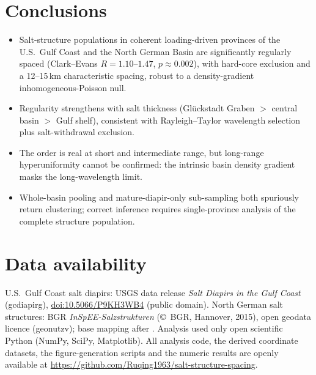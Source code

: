 \documentclass[11pt]{article}
\begin{document}
\section{Conclusions}
\begin{itemize}\setlength\itemsep{1pt}
\item Salt-structure populations in coherent loading-driven provinces of the U.S.\ Gulf Coast and the North
German Basin are significantly regularly spaced (Clark--Evans $R=1.10$--$1.47$, $p\approx0.002$), with
hard-core exclusion and a 12--15\,km characteristic spacing, robust to a density-gradient
inhomogeneous-Poisson null.
\item Regularity strengthens with salt thickness (Gl\"uckstadt Graben $>$ central basin $>$ Gulf shelf),
consistent with Rayleigh--Taylor wavelength selection plus salt-withdrawal exclusion.
\item The order is real at short and intermediate range, but long-range hyperuniformity cannot be confirmed:
the intrinsic basin density gradient masks the long-wavelength limit.
\item Whole-basin pooling and mature-diapir-only sub-sampling both spuriously return clustering; correct
inference requires single-province analysis of the complete structure population.
\end{itemize}

\section*{Data availability}
U.S.\ Gulf Coast salt diapirs: USGS data release \emph{Salt Diapirs in the Gulf Coast} (gcdiapirg),
\href{https://doi.org/10.5066/P9KH3WB4}{doi:10.5066/\allowbreak P9KH3WB4} (public domain). North German salt structures:
BGR \emph{InSpEE-Salzstrukturen} (\copyright\ BGR, Hannover, 2015), open geodata licence (geonutzv); base
mapping after \citet{reinhold2008}. Analysis used only open scientific Python (NumPy, SciPy, Matplotlib).
All analysis code, the derived coordinate datasets, the figure-generation scripts and the numeric results
are openly available at \url{https://github.com/Ruqing1963/salt-structure-spacing}.
\end{document}
